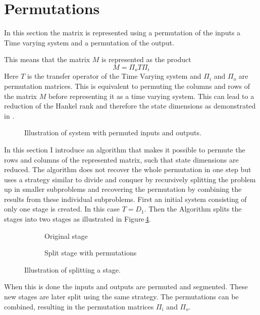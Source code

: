 \documentclass[numbers=noenddot,doctype=mastersthesis,BCOR=15mm,biblatex]{ldvbook}%
\begin{document}
 

\section{Permutations}\label{sec:permutation}

In this section the matrix is represented using a permutation  of the inputs a Time varying system and a permutation of the output.

This means that the matrix $M$ is represented as the product
\begin{equation}
M = \Pi_o T \Pi_i
\end{equation}
Here $T$ is the transfer operator of the Time Varying system and $\Pi_i$ and $\Pi_o$ are permutation matrices.
This is equivalent to permuting the columns and rows of the matrix $M$ before representing it as a time varying system.
This can lead to a reduction of the Hankel rank and therefore the state dimensions as demonstrated in \cite{diepold_optic_2004}. 
\begin{figure}[!htb]
	\centering
	
	\caption{Illustration of system with permuted inputs and outputs.}
	\label{fig:system_permuted}
\end{figure}
In this section I introduce an algorithm that makes it possible to permute the rows and columns of the represented matrix, such that state dimensions are reduced.
The algorithm does not recover the whole permutation in one step but uses a strategy similar to divide and conquer by recursively splitting the problem up in smaller subproblems and recovering the permutation by combining the results from these individual subproblems.
First an initial system consisting of only one stage is created.
In this case $T = D_1$.
Then the Algorithm splits the stages into two stages as illustrated in Figure\,\ref{fig:split_permute}.
\begin{figure}[!htb]
	\centering
	
	\begin{subfigure}[b]{0.45\textwidth}
		\caption{Original stage}
		\label{fig:split_permute_a}
	\end{subfigure}
	\hspace{0.8cm}
	\begin{subfigure}[b]{0.45\textwidth}
		\caption{Split stage with permutations}
		\label{fig:split_permute_b}
	\end{subfigure}
	\caption{Illustration of splitting a stage.}
	\label{fig:split_permute}
\end{figure}
When this is done the inputs and outputs are permuted and segmented.
These new stages are later split using the same strategy.
The permutations can be combined, resulting in the permutation matrices $\Pi_i$ and $\Pi_o$.
\end{document}
